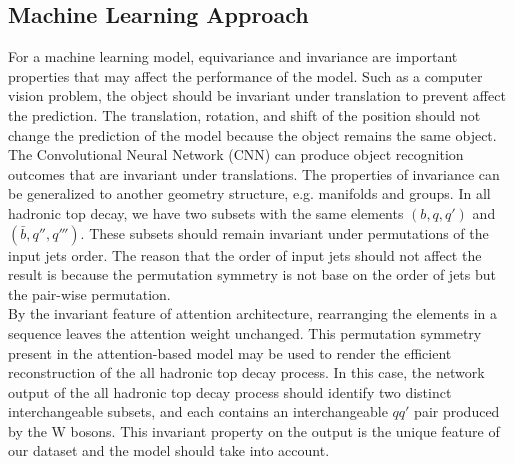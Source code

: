 \subsection{Machine Learning Approach}\label{subsec:ML approach}
For a machine learning model, equivariance and invariance are important properties that may affect the performance of the model. Such as a computer vision problem, the object should be invariant under translation to prevent affect the prediction. The translation, rotation, and shift of the position should not change the prediction of the model because the object remains the same object. The Convolutional Neural Network (CNN) can produce object recognition outcomes that are invariant under translations. The properties of invariance can be generalized to another geometry structure, e.g. manifolds and groups. In all hadronic top decay, we have two subsets with the same elements $(b, q, q')$ and $(\bar{b}, q'', q''')$. These subsets should remain invariant under permutations of the input jets order. The reason that the order of input jets should not affect the result is because the permutation symmetry is not base on the order of jets but the pair-wise permutation.
\\
By the invariant feature of attention architecture, rearranging the elements in a sequence leaves the attention weight unchanged. This permutation symmetry present in the attention-based model may be used to render the efficient reconstruction of the all hadronic top decay process. In this case, the network output of the all hadronic top decay process should identify two distinct interchangeable subsets, and each contains an interchangeable $qq'$ pair produced by the W bosons. This invariant property on the output is the unique feature of our dataset and the model should take into account. 
\\
